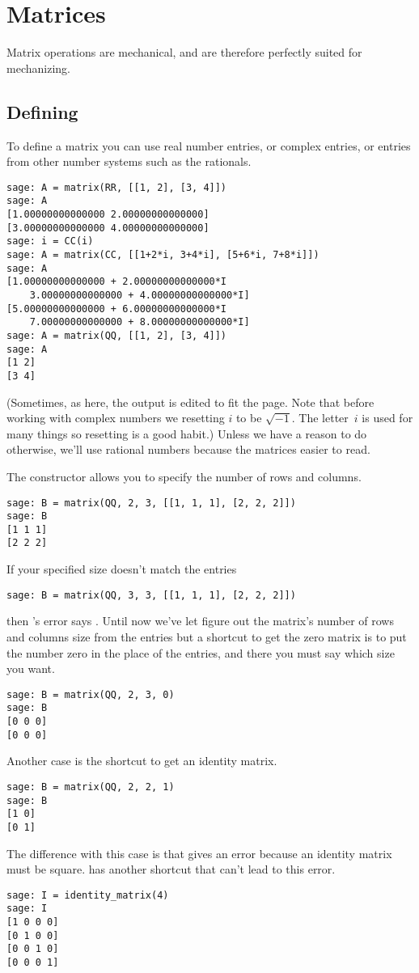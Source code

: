 \chapter{Matrices}

Matrix operations are mechanical, and are therefore perfectly suited for 
mechanizing.



\section{Defining}
To define a matrix 
you can use real number entries, or complex entries, or 
entries from other number systems such as the rationals. 
\begin{lstlisting}
sage: A = matrix(RR, [[1, 2], [3, 4]])
sage: A
[1.00000000000000 2.00000000000000]
[3.00000000000000 4.00000000000000]
sage: i = CC(i)
sage: A = matrix(CC, [[1+2*i, 3+4*i], [5+6*i, 7+8*i]])
sage: A
[1.00000000000000 + 2.00000000000000*I 
    3.00000000000000 + 4.00000000000000*I]
[5.00000000000000 + 6.00000000000000*I 
    7.00000000000000 + 8.00000000000000*I]
sage: A = matrix(QQ, [[1, 2], [3, 4]])
sage: A                               
[1 2]
[3 4]
\end{lstlisting}
(Sometimes, as here, the output is edited to fit the page.
Note that before working with complex numbers we resetting 
$i$ to be $\sqrt{-1}$.
The letter~$i$ is used for many things so 
resetting is a good habit.)
Unless we have a reason to do otherwise, 
we'll use rational numbers because the matrices easier to read.

The  constructor allows you to specify the number of
rows and columns.
\begin{lstlisting}
sage: B = matrix(QQ, 2, 3, [[1, 1, 1], [2, 2, 2]])  
sage: B
[1 1 1]
[2 2 2]
\end{lstlisting}
If your specified size doesn't match the entries 
\begin{lstlisting}
sage: B = matrix(QQ, 3, 3, [[1, 1, 1], [2, 2, 2]])  
\end{lstlisting}
then \Sage's error says
.
Until now we've let \Sage{} figure out the matrix's 
number of rows and columns size from the entries but
a shortcut to get the zero matrix 
is to put the number zero in the place of the entries, and there you
must say which size you want.
\begin{lstlisting}
sage: B = matrix(QQ, 2, 3, 0)                     
sage: B
[0 0 0]
[0 0 0]  
\end{lstlisting}
Another case is 
the shortcut to get an identity matrix.
\begin{lstlisting}
sage: B = matrix(QQ, 2, 2, 1)
sage: B
[1 0]
[0 1]
\end{lstlisting}
The difference with this case is that 
 gives an error because 
an identity matrix must be square.
\Sage{} has another shortcut that can't lead to this error.
\begin{lstlisting}
sage: I = identity_matrix(4)
sage: I
[1 0 0 0]
[0 1 0 0]
[0 0 1 0]
[0 0 0 1]
\end{lstlisting}

